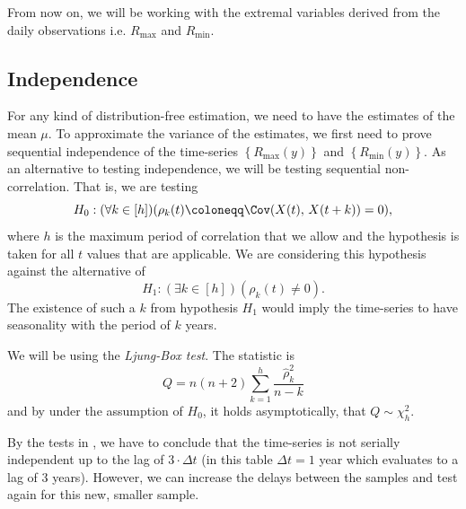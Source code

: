 \begin{table}[th]
        \centering
        
        \caption{Elementary statistics of extremal values}
        \label{tbl:max_stats}
\end{table}


From now on, we will be working with the extremal variables derived from the daily observations i.e. \(R_{\max}\) and
\(R_{\min}\).

\subsection{Independence}%
\label{sub:independence}
For any kind of distribution-free estimation, we need to have the estimates of the mean \(\mu\). To approximate the
variance of the estimates, we first need to prove sequential independence of the time-series \(\left\{ R_{\max}(y) \right\}\) and 
\(\left\{ R_{\min}(y) \right\}\). As an alternative to testing independence, we will be testing sequential non-correlation.
That is, we are testing \[
    H_0: (\forall k \in \left[ h \right])(\rho_k(t) \coloneqq \Cov(X(t),\, X(t+k)) = 0),
\] 
where \(h\) is the maximum period of correlation that we allow and the hypothesis is taken for all \(t\) values that are
applicable. We are considering this hypothesis against the alternative of \[
    H_1: (\exists k \in \left[ h \right])(\rho_k(t) \neq 0).
\] 
The existence of such a \(k\) from hypothesis \(H_1\) would imply the time-series to have seasonality with the period of
\(k\) years.

We will be using the \emph{Ljung-Box test}. The statistic is \[
    Q = n(n+2) \sum_{k = 1}^{h} \frac{ \hat{\rho}_k^2 }{n - k}
\] and by \cite{ljungMeasureLackFit1978} under the assumption of \(H_0\), it holds asymptotically, that \(Q \sim \chi^2_{h}\).

\begin{table}[H]
  \centering
  
  \caption{Ljung-Box test of serial correlation (independence) and Box-Pierce test for completeness, even though it
  is a only a simplified version of the Ljung-Box test.}
  \label{tab:indep_test}
\end{table}

By the tests in , we have to conclude that the time-series is not serially independent up to the lag
of \(3 \cdot\Delta t\) (in this table \(\Delta t = 1\) year which evaluates to a lag of 3 years). However, we can increase the delays between the samples and test again for this new, smaller sample.

